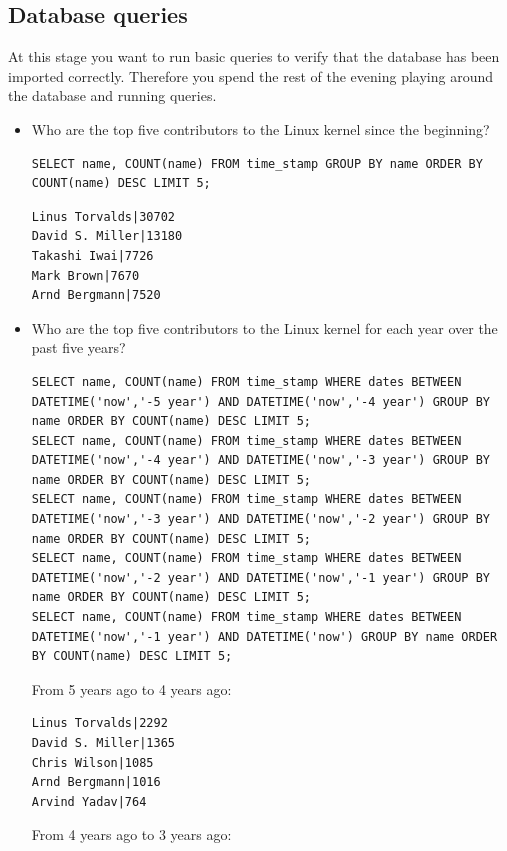 \documentclass[a4paper]{article}
\begin{document}
\subsection{Database queries}
At this stage you want to run basic queries to verify that the database has been imported correctly. Therefore you spend the rest of the evening playing around the database and running queries.
\begin{itemize}
    \item Who are the top five contributors to the Linux kernel since the beginning?\\
    \begin{verbatim}
SELECT name, COUNT(name) FROM time_stamp GROUP BY name ORDER BY COUNT(name) DESC LIMIT 5;
    \end{verbatim}
    \begin{verbatim}
Linus Torvalds|30702
David S. Miller|13180
Takashi Iwai|7726
Mark Brown|7670
Arnd Bergmann|7520
    \end{verbatim}
    \item Who are the top five contributors to the Linux kernel for each year over the past five years?
    \begin{verbatim}
SELECT name, COUNT(name) FROM time_stamp WHERE dates BETWEEN DATETIME('now','-5 year') AND DATETIME('now','-4 year') GROUP BY name ORDER BY COUNT(name) DESC LIMIT 5;
SELECT name, COUNT(name) FROM time_stamp WHERE dates BETWEEN DATETIME('now','-4 year') AND DATETIME('now','-3 year') GROUP BY name ORDER BY COUNT(name) DESC LIMIT 5;
SELECT name, COUNT(name) FROM time_stamp WHERE dates BETWEEN DATETIME('now','-3 year') AND DATETIME('now','-2 year') GROUP BY name ORDER BY COUNT(name) DESC LIMIT 5;
SELECT name, COUNT(name) FROM time_stamp WHERE dates BETWEEN DATETIME('now','-2 year') AND DATETIME('now','-1 year') GROUP BY name ORDER BY COUNT(name) DESC LIMIT 5;
SELECT name, COUNT(name) FROM time_stamp WHERE dates BETWEEN DATETIME('now','-1 year') AND DATETIME('now') GROUP BY name ORDER BY COUNT(name) DESC LIMIT 5;
    \end{verbatim}
    From 5 years ago to 4 years ago:
    \begin{verbatim}
Linus Torvalds|2292
David S. Miller|1365
Chris Wilson|1085
Arnd Bergmann|1016
Arvind Yadav|764
    \end{verbatim}
    From 4 years ago to 3 years ago:
    \begin{verbatim}

\end{verbatim}
\end{itemize}
\end{document}
